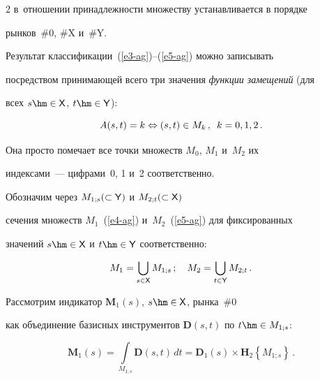 \begin{multicols}{2}
в~отношении принадлежности множеству устанавливается в порядке 


рынков~\#0, \#X и~\#Y. 


  


  Результат классификации~(\ref{e3-ag})--(\ref{e5-ag}) можно записывать 


посредством принимающей всего три значения \textit{функции замещений} (для 


всех $s \hm\in{\sf X}$, $t \hm\in {\sf Y}$):


  \begin{equation}


  A(s,t)=k\Leftrightarrow (s,t)\in M_k\,,\enskip k=0,1,2\,.


  \label{e6-ag}


  \end{equation}


    Она просто помечает все точки множеств $M_0$, $M_1$ и~$M_2$ их 


индексами~--- цифрами~0, 1 и~2 соответственно. 


  


  Обозначим через $M_{1;s}(\subset {\sf Y})$ и $M_{2;t}(\subset {\sf X})$ 


сечения множеств $M_{1}$~(\ref{e4-ag}) и~$M_2$~(\ref{e5-ag}) для фиксированных 


значений $s\hm\in{\sf X}$ и $t\hm\in {\sf Y}$ соответственно: 


  $$


  M_1=\bigcup\limits_{s\in{\sf X}} M_{1;s}\,;\quad M_2=\bigcup_{t\in {\sf Y}} 


M_{2;t}\,.


  $$


  


  Рассмотрим индикатор $\boldsymbol{M}_1(s)$, $s \hm\in{\sf X}$, рынка~\#0 


как объединение базисных инструментов $\boldsymbol{D}(s, t)$ по $t \hm\in 


M_{1;s}$: 


  \begin{equation}


  \boldsymbol{M}_1(s)=\int\limits_{M_{1;s}} \boldsymbol{D}(s,t)\,dt 


=\boldsymbol{D}_1(s)\times \boldsymbol{H}_2\left\{ M_{1;s}\right\}\,.


  \label{e7-ag}


  \end{equation}



\end{multicols}
